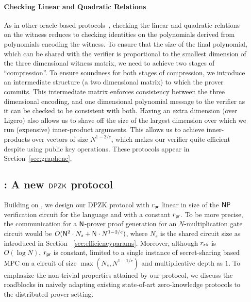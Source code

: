 \paragraph{Checking Linear and Quadratic Relations} As in other oracle-based protocols~\cite{ligero,aurora}, checking the linear and quadratic relations on the witness reduces to 
 checking identities on the polynomials derived from polynomials encoding the witness. 
To ensure that the size of the final polynomial, which can be shared with the verifier is
proportional to the smallest dimension of the three dimensional witness matrix,
we need to achieve two stages of ``compression''. To ensure soundness for both
stages of compression, we introduce an intermediate structure (a two dimensional
matrix) to which the prover commits. This intermediate matrix enforces
consistency between the three dimensional encoding, and one dimensional
polynomial message to the verifier as it can be checked to be consistent with
both. Having an extra dimension (over Ligero) also allows us to shave off the size of the
largest dimension over which we run (expensive) inner-product arguments. This
allows us to achieve inner-products over vectors of size $N^{1-2/c}$, which
makes our verifier quite efficient despite using public key operations. These
protocols appear in Section~\ref{sec:graphene}.


\subsection{\dpname: A new $\mathsf{DPZK}$ protocol}
Building on \name{}, we design our DPZK protocol \dpname{} with  $c_\mathsf{pr}$ linear in size of the $\mathsf{NP}$ verification circuit for the language and with a constant $r_\mathsf{pr}$. To be more precise, the communication for a
$\mathsf{N}$-prover proof generation for an $N$-multiplication gate circuit 
would be $O(\mathsf{N}^2\cdot N_s + \mathsf{N} \cdot N^{1-2/c})$, where
$N_s$ is the shared circuit size as introduced in Section
~\ref{sec:efficiencyparams}. Moreover, although $r_\mathsf{zk}$ is $O(\log{N})$, $r_\mathsf{pr}$ is constant, limited to a single instance of secret-sharing based MPC on a circuit
of size $\max(N_s,N^{1-1/c})$ and multiplicative depth as $1$. To emphasize the non-trivial properties attained
by our protocol, we discuss the roadblocks in naively adapting existing
state-of-art zero-knowledge protocols to the distributed prover
setting.\smallskip

